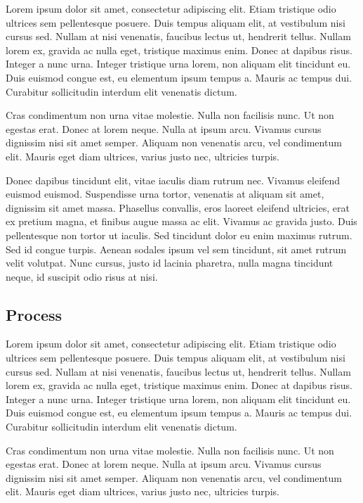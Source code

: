 \documentclass[11pt, a4paper]{resources/JTH}
\begin{document}
Lorem ipsum dolor sit amet, consectetur adipiscing elit. Etiam tristique odio ultrices sem pellentesque posuere. Duis tempus aliquam elit, at vestibulum nisi cursus sed. Nullam at nisi venenatis, faucibus lectus ut, hendrerit tellus. Nullam lorem ex, gravida ac nulla eget, tristique maximus enim. Donec at dapibus risus. Integer a nunc urna. Integer tristique urna lorem, non aliquam elit tincidunt eu. Duis euismod congue est, eu elementum ipsum tempus a. Mauris ac tempus dui. Curabitur sollicitudin interdum elit venenatis dictum. \citep{beck2003test}

Cras condimentum non urna vitae molestie. Nulla non facilisis nunc. Ut non egestas erat. Donec at lorem neque. Nulla at ipsum arcu. Vivamus cursus dignissim nisi sit amet semper. Aliquam non venenatis arcu, vel condimentum elit. Mauris eget diam ultrices, varius justo nec, ultricies turpis.

Donec dapibus tincidunt elit, vitae iaculis diam rutrum nec. Vivamus eleifend euismod euismod. Suspendisse urna tortor, venenatis at aliquam sit amet, dignissim sit amet massa. Phasellus convallis, eros laoreet eleifend ultricies, erat ex pretium magna, et finibus augue massa ac elit. Vivamus ac gravida justo. Duis pellentesque non tortor ut iaculis. Sed tincidunt dolor eu enim maximus rutrum. Sed id congue turpis. Aenean sodales ipsum vel sem tincidunt, sit amet rutrum velit volutpat. Nunc cursus, justo id lacinia pharetra, nulla magna tincidunt neque, id suscipit odio risus at nisi.

\subsection{Process}

Lorem ipsum dolor sit amet, consectetur adipiscing elit. Etiam tristique odio ultrices sem pellentesque posuere. Duis tempus aliquam elit, at vestibulum nisi cursus sed. Nullam at nisi venenatis, faucibus lectus ut, hendrerit tellus. Nullam lorem ex, gravida ac nulla eget, tristique maximus enim. Donec at dapibus risus. Integer a nunc urna. Integer tristique urna lorem, non aliquam elit tincidunt eu. Duis euismod congue est, eu elementum ipsum tempus a. Mauris ac tempus dui. Curabitur sollicitudin interdum elit venenatis dictum.

Cras condimentum non urna vitae molestie. Nulla non facilisis nunc. Ut non egestas erat. Donec at lorem neque. Nulla at ipsum arcu. Vivamus cursus dignissim nisi sit amet semper. Aliquam non venenatis arcu, vel condimentum elit. Mauris eget diam ultrices, varius justo nec, ultricies turpis.
\end{document}
